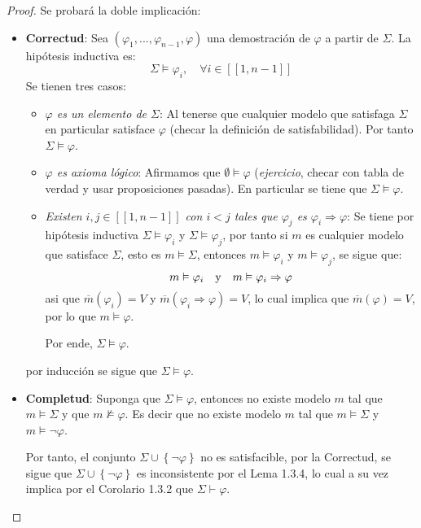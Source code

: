 \documentclass[12pt]{report}
\newcounter{it}
\theoremstyle{largebreak}
\newcommand\natint[1]{\ensuremath{\left[\!\left[ #1\right]\!\right]}}
\begin{document}
    \begin{proof}
        Se probará la doble implicación:
        \begin{itemize}
            \item \textbf{Correctud}: Sea $(\varphi_1,...,\varphi_{ n-1},\varphi)$ una demostración de $\varphi$ a partir de $\Sigma$. La hipótesis inductiva es:
            \begin{equation*}
                \Sigma\vDash\varphi_{ i},\quad\forall i\in\natint{1,n-1}
            \end{equation*}
            Se tienen tres casos:
            \begin{itemize}
                \item \textit{$\varphi$ es un elemento de $\Sigma$}: Al tenerse que cualquier modelo que satisfaga $\Sigma$ en particular satisface $\varphi$ (checar la definición de satisfabilidad). Por tanto $\Sigma\vDash\varphi$.
                \item \textit{$\varphi$ es axioma lógico}: Afirmamos que $\emptyset\vDash\varphi$ (\textit{ejercicio}, checar con tabla de verdad y usar proposiciones pasadas). En particular se tiene que $\Sigma\vDash\varphi$.
                \item \textit{Existen $i,j\in\natint{1,n-1}$ con $i<j$ tales que $\varphi_j$ es $\varphi_i\Rightarrow\varphi$}: Se tiene por hipótesis inductiva $\Sigma\vDash\varphi_i$ y $\Sigma\vDash\varphi_j$, por tanto si $m$ es cualquier modelo que satisface $\Sigma$, esto es $m\vDash\Sigma$, entonces $m\vDash\varphi_i$ y $m\vDash\varphi_j$, se sigue que:
                \begin{equation*}
                    m\vDash\varphi_i\quad\textup{y}\quad m\vDash\varphi_i\Rightarrow\varphi
                \end{equation*}
                asi que $\overline{m}(\varphi_i)=V$ y $\overline{m}(\varphi_i\Rightarrow\varphi)=V$, lo cual implica que $\overline{m}(\varphi)=V$, por lo que $m\vDash\varphi$.

                Por ende, $\Sigma\vDash\varphi$.
            \end{itemize}
            por inducción se sigue que $\Sigma\vDash\varphi$.
            \item \textbf{Completud}: Suponga que $\Sigma\vDash\varphi$, entonces no existe modelo $m$ tal que $m\vDash\Sigma$ y que $m\nvDash\varphi$. Es decir que no existe modelo $m$ tal que $m\vDash\Sigma$ y $m\vDash\neg\varphi$.
            
            Por tanto, el conjunto $\Sigma\cup\left\{\neg\varphi\right\}$ no es satisfacible, por la Correctud, se sigue que $\Sigma\cup\left\{\neg\varphi\right\}$ es inconsistente por el Lema 1.3.4, lo cual a su vez implica por el Corolario 1.3.2 que $\Sigma\vdash\varphi$.
        \end{itemize}
    \end{proof}
\end{document}
